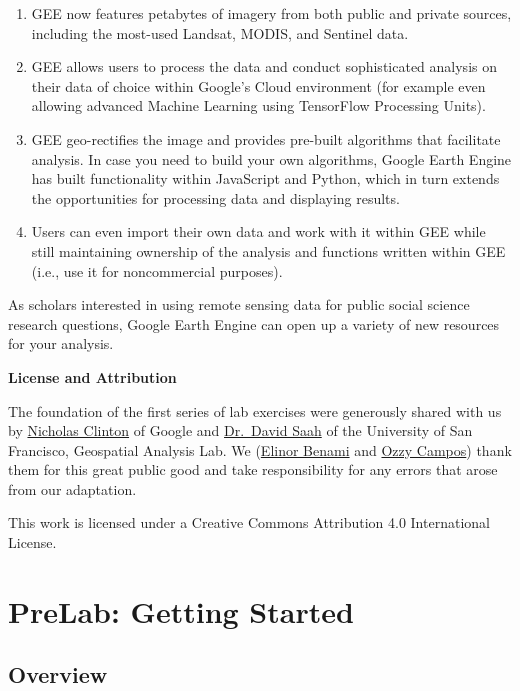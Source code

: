 \documentclass[
]{article}
\providecommand{\tightlist}{%
  \setlength{\itemsep}{0pt}\setlength{\parskip}{0pt}}
\begin{document}
\begin{enumerate}
\def\labelenumi{\arabic{enumi}.}
\tightlist
\item
  GEE now features petabytes of imagery from both public and private sources, including the most-used Landsat, MODIS, and Sentinel data.
\item
  GEE allows users to process the data and conduct sophisticated analysis on their data of choice within Google's Cloud environment (for example even allowing advanced Machine Learning using TensorFlow Processing Units).
\item
  GEE geo-rectifies the image and provides pre-built algorithms that facilitate analysis. In case you need to build your own algorithms, Google Earth Engine has built functionality within JavaScript and Python, which in turn extends the opportunities for processing data and displaying results.
\item
  Users can even import their own data and work with it within GEE while still maintaining ownership of the analysis and functions written within GEE (i.e., use it for noncommercial purposes).
\end{enumerate}

As scholars interested in using remote sensing data for public social science research questions, Google Earth Engine can open up a variety of new resources for your analysis.

\textbf{License and Attribution}

The foundation of the first series of lab exercises were generously shared with us by \href{https://research.google/people/NicholasEtienneClinton/}{Nicholas Clinton} of Google and \href{https://www.usfca.edu/faculty/david-saah}{Dr.~David Saah} of the University of San Francisco, Geospatial Analysis Lab. We (\href{https://www.ebenami.com/}{Elinor Benami} and \href{https://ozzycampos.com/}{Ozzy Campos}) thank them for this great public good and take responsibility for any errors that arose from our adaptation.

This work is licensed under a Creative Commons Attribution 4.0 International License.

\hypertarget{prelab-getting-started}{%
\section*{PreLab: Getting Started}\label{prelab-getting-started}}

\hypertarget{overview}{%
\subsection*{Overview}\label{overview}}
\end{document}
